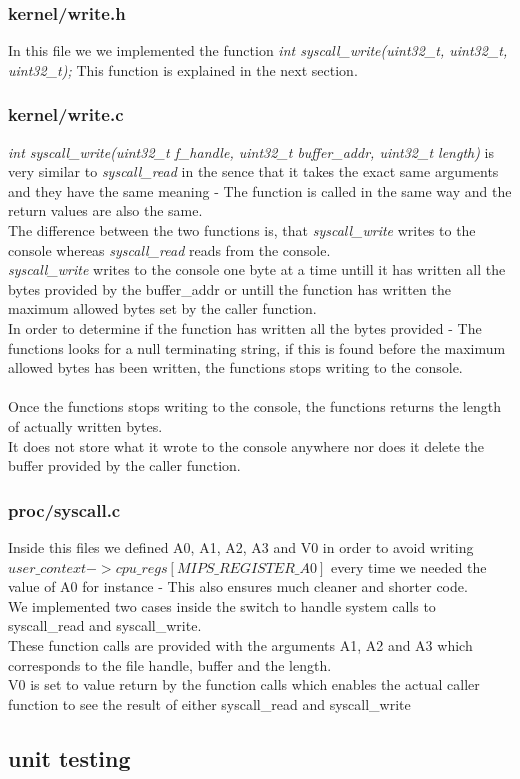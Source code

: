 \documentclass[a4paper,12pt,danish]{report}
\begin{document}
\subsubsection{kernel/write.h}
In this file we we implemented the function \textit{int syscall\_write(uint32\_t, uint32\_t, uint32\_t);}
This function is explained in the next section.
\subsubsection{kernel/write.c}
\textit{int syscall\_write(uint32\_t f\_handle, uint32\_t buffer\_addr, uint32\_t length)} is very similar to \textit{syscall\_read} in the sence that it takes the exact same arguments and they have the same meaning - The function is called in the same way and the return values are also the same.
\\
The difference between the two functions is, that \textit{syscall\_write} writes to the console whereas \textit{syscall\_read} reads from the console.
\\
\textit{syscall\_write} writes to the console one byte at a time untill it has written all the bytes provided by the buffer\_addr or untill the function has written the maximum allowed bytes set by the caller function.
\\
In order to determine if the function has written all the bytes provided - The functions looks for a null terminating string, if this is found before the maximum allowed bytes has been written, the functions stops writing to the console.
\\
\\
Once the functions stops writing to the console, the functions returns the length of actually written bytes.
\\
It does not store what it wrote to the console anywhere nor does it delete the buffer provided by the caller function.
\subsubsection{proc/syscall.c}
Inside this files we defined A0, A1, A2, A3 and V0 in order to avoid writing \textit{$user\_context->cpu\_regs[MIPS\_REGISTER\_A0]$} every time we needed the value of A0 for instance - This also ensures much cleaner and shorter code.
\\
We implemented two cases inside the switch to handle system calls to syscall\_read and syscall\_write.
\\
These function calls are provided with the arguments A1, A2 and A3 which corresponds to the file handle, buffer and the length.\\
V0 is set to value return by the function calls which enables the actual caller function to see the result of either syscall\_read and syscall\_write
\subsection{unit testing}
\end{document}
